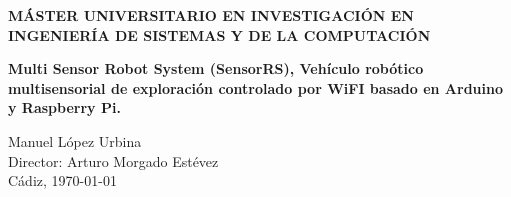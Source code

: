 \begin{titlepage}
\begin{center}
    \Large{\textbf{MÁSTER UNIVERSITARIO EN INVESTIGACIÓN EN INGENIERÍA DE SISTEMAS Y DE LA COMPUTACIÓN}} \\

    \vspace{3.0cm}

    \Large{\textbf{ Multi Sensor Robot System (SensorRS), Vehículo robótico multisensorial de exploración controlado por WiFI basado en Arduino y Raspberry Pi. }} \\

    \vspace{3.0cm}

    \normalsize{Manuel López Urbina \\
    Director: Arturo Morgado Estévez }\\

    \vspace{1.5cm}
    Cádiz, \today

  \end{center}
\end{titlepage}


